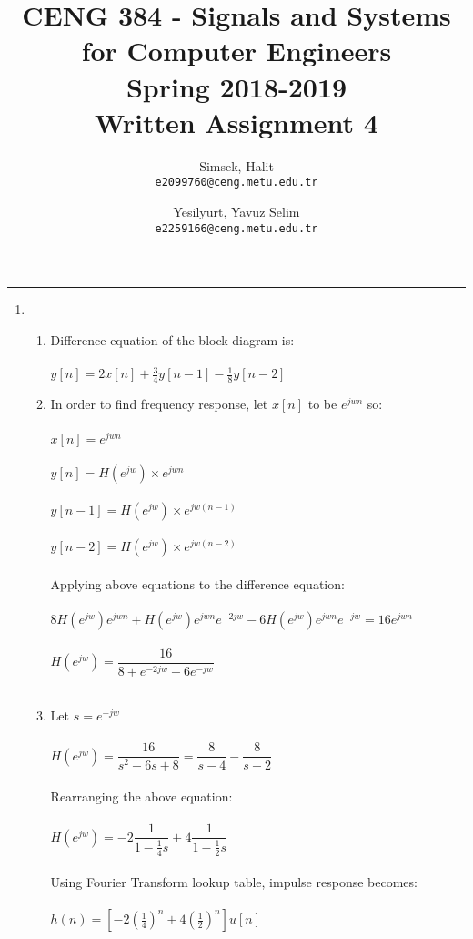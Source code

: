 \documentclass[10pt,a4paper, margin=1in]{article}
\author{
  Simsek, Halit \\
  \texttt{e2099760@ceng.metu.edu.tr}
  \and
  Yesilyurt, Yavuz Selim \\
  \texttt{e2259166@ceng.metu.edu.tr}
}
\title{CENG 384 - Signals and Systems for Computer Engineers \\
Spring 2018-2019 \\
Written Assignment 4}
\begin{document}
\maketitle



\noindent\rule{19cm}{1.2pt}

\begin{enumerate}

\item 
    \begin{enumerate}
    \item Difference equation of the block diagram is: \\
    \\
    $y[n] = 2x[n] + \frac{3}{4}y[n-1] - \frac{1}{8}y[n-2]$ \\
    
    \item In order to find frequency response, let $x[n]$ to be $e^{jwn}$ so: \\
    \\
    $x[n] = e^{jwn}$ \\
    \\
    $y[n] = H(e^{jw}) \times e^{jwn}$ \\
    \\
    $y[n-1] = H(e^{jw}) \times e^{jw(n-1)}$ \\
    \\
    $y[n-2] = H(e^{jw}) \times e^{jw(n-2)}$ \\
    \\
    Applying above equations to the difference equation: \\
    \\
    $8H(e^{jw})e^{jwn} + H(e^{jw})e^{jwn}e^{-2jw} - 6H(e^{jw})e^{jwn}e^{-jw} = 16e^{jwn}$ \\
    \\
    $H(e^{jw}) = \dfrac{16}{8 + e^{-2jw} - 6e^{-jw}}$ \\
    \\
    \item Let $s = e^{-jw}$ \\
    \\
    $H(e^{jw}) = \dfrac{16}{s^2 -6s + 8} = \dfrac{8}{s-4} - \dfrac{8}{s-2}$ \\
    \\
    Rearranging the above equation: \\
    \\
    $H(e^{jw}) = -2\dfrac{1}{1 - \frac{1}{4}s} + 4\dfrac{1}{1 - \frac{1}{2}s}$ \\
    \\
    Using Fourier Transform lookup table, impulse response becomes: \\
    \\
    $h(n) = [-2(\frac{1}{4})^n + 4(\frac{1}{2})^n]u[n]$
    \\
    

\end{enumerate}
\end{enumerate}
\end{document}
